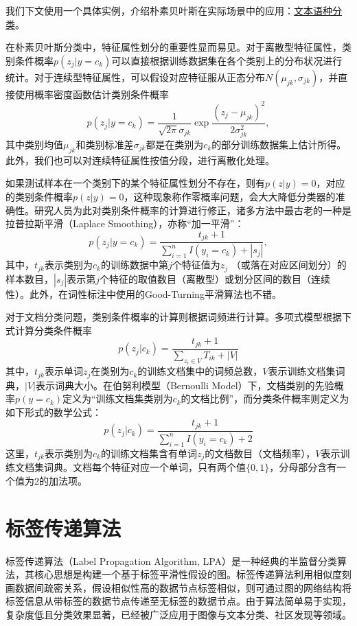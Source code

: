我们下文使用一个具体实例，介绍朴素贝叶斯在实际场景中的应用：\href{http://www.ling.upenn.edu/courses/ling052/BinaryClassification.html}{文本语种分类}。

在朴素贝叶斯分类中，特征属性划分的重要性显而易见。对于离散型特征属性，类别条件概率$p(z_j|y=c_k)$可以直接根据训练数据集在各个类别上的分布状况进行统计。对于连续型特征属性，可以假设对应特征服从正态分布$N(\mu_{jk}, \sigma_{jk})$，并直接使用概率密度函数估计类别条件概率
\begin{equation}
    p(z_j|y=c_k) = \frac{1}{\sqrt{2\pi} \sigma_{jk}} \exp \frac{(z_j - \mu_{jk})^2}{2\sigma_{jk}^2},
\end{equation}
其中类别均值$\mu_{jk}$和类别标准差$\sigma_{jk}$都是在类别为$c_k$的部分训练数据集上估计所得。此外，我们也可以对连续特征属性按值分段，进行离散化处理。

如果测试样本在一个类别下的某个特征属性划分不存在，则有$p(z|y)=0$，对应的类别条件概率$p(z|y)=0$，这种现象称作零概率问题，会大大降低分类器的准确性。研究人员为此对类别条件概率的计算进行修正，诸多方法中最古老的一种是拉普拉斯平滑（Laplace Smoothing），亦称“加一平滑”：
\begin{equation}\label{eq:laplacesmooth}
    p(z_j|y=c_k) = \frac{t_{jk} + 1}{\sum\limits_{i=1}^n I(y_i = c_k) + |s_j|},
\end{equation}
其中，$t_{jk}$表示类别为$c_k$的训练数据中第$j$个特征值为$z_j$ （或落在对应区间划分）的样本数目，$|s_j|$表示第$j$个特征的取值数目（离散型）或划分区间的数目（连续性）。此外，在词性标注中使用的Good-Turning平滑算法也不错。

对于文档分类问题，类别条件概率的计算则根据词频进行计算。多项式模型根据下式计算分类条件概率
\begin{equation}
    p(z_j|c_k) = \frac{t_{jk} + 1}{\sum\limits_{z_i\in V} T_{ik} + |V|}
\end{equation}
其中，$t_{jk}$表示单词$z_j$在类别为$c_k$的训练文档集中的词频总数，$V$表示训练文档集词典，$|V|$表示词典大小。在伯努利模型（Bernoulli Model）下，文档类别的先验概率$p(y = c_k)$定义为“训练文档集类别为$c_k$的文档比例”，而分类条件概率则定义为如下形式的数学公式：
\begin{equation}
    p(z_j|c_k) = \frac{t_{jk} + 1}{\sum\limits_{i=1}^n I(y_i = c_k) + 2}
\end{equation}
这里，$t_{jk}$表示类别为$c_k$的训练文档集含有单词$z_j$的文档数目（文档频率），$V$表示训练文档集词典。文档每个特征对应一个单词，只有两个值$\{0,1\}$，分母部分含有一个值为2的加法项。

\section{标签传递算法}
标签传递算法（Label Propagation Algorithm, LPA）是一种经典的半监督分类算法，其核心思想是构建一个基于标签平滑性假设的图。标签传递算法利用相似度刻画数据间疏密关系，假设相似性高的数据节点标签相似，则可通过图的网络结构将标签信息从带标签的数据节点传递至无标签的数据节点。由于算法简单易于实现，复杂度低且分类效果显著，已经被广泛应用于图像与文本分类、社区发现等领域。

